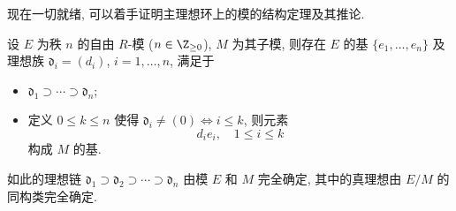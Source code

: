 现在一切就绪, 可以着手证明主理想环上的模的结构定理及其推论.
\begin{theorem}[初等因子定理]\label{prop:elementary-divisor-sub}
	设 $E$ 为秩 $n$ 的自由 $R$-模 ($n \in \Z_{\geq 0}$), $M$ 为其子模, 则存在 $E$ 的基 $\{e_1, \ldots, e_n\}$ 及理想族 $\mathfrak{d}_i = (d_i)$, $i=1, \ldots, n$, 满足于
	\begin{itemize}
		\item $\mathfrak{d}_1 \supset \cdots \supset \mathfrak{d}_n$;
		\item 定义 $0 \leq k \leq n$ 使得 $\mathfrak{d}_i \neq (0) \iff i \leq k$, 则元素
			\[ d_i e_i, \quad 1 \leq i \leq k \]
		构成 $M$ 的基.
	\end{itemize}
	如此的理想链 $\mathfrak{d}_1 \supset \mathfrak{d}_2 \supset \cdots \supset \mathfrak{d}_n$ 由模 $E$ 和 $M$ 完全确定, 其中的真理想由 $E/M$ 的同构类完全确定.
\end{theorem}
